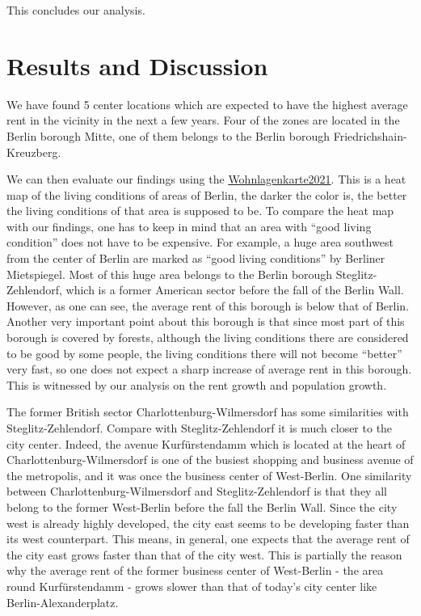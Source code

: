 \documentclass[11pt]{article}
\begin{document}
        
    This concludes our analysis.

    \hypertarget{results-and-discussion}{%
\section{\texorpdfstring{Results and Discussion
}{Results and Discussion }}\label{results}}

    We have found 5 center locations which are expected to have the highest
average rent in the vicinity in the next a few years. Four of the zones
are located in the Berlin borough Mitte, one of them belongs to the
Berlin borough Friedrichshain-Kreuzberg.

We can then evaluate our findings using the
\href{https://www.stadtentwicklung.berlin.de/wohnen/mietspiegel/de/download/Wohnlagenkarte2021_highdpi.pdf}{Wohnlagenkarte2021}.
This is a heat map of the living conditions of areas of Berlin, the
darker the color is, the better the living conditions of that area is
supposed to be. To compare the heat map with our findings, one has to
keep in mind that an area with ``good living condition'' does not have
to be expensive. For example, a huge area southwest from the center of
Berlin are marked as ``good living conditions'' by Berliner Mietspiegel.
Most of this huge area belongs to the Berlin borough
Steglitz-Zehlendorf, which is a former American sector before the fall
of the Berlin Wall. However, as one can see, the average rent of this
borough is below that of Berlin. Another very important point about this
borough is that since most part of this borough is covered by forests,
although the living conditions there are considered to be good by some
people, the living conditions there will not become ``better'' very
fast, so one does not expect a sharp increase of average rent in this
borough. This is witnessed by our analysis on the rent growth and
population growth.

The former British sector Charlottenburg-Wilmersdorf has some
similarities with Steglitz-Zehlendorf. Compare with Steglitz-Zehlendorf
it is much closer to the city center. Indeed, the avenue Kurfürstendamm
which is located at the heart of Charlottenburg-Wilmersdorf is one of
the busiest shopping and business avenue of the metropolis, and it was
once the business center of West-Berlin. One similarity between
Charlottenburg-Wilmersdorf and Steglitz-Zehlendorf is that they all
belong to the former West-Berlin before the fall the Berlin Wall. Since
the city west is already highly developed, the city east seems to be
developing faster than its west counterpart. This means, in general, one
expects that the average rent of the city east grows faster than that of
the city west. This is partially the reason why the average rent of the
former business center of West-Berlin - the area round Kurfürstendamm -
grows slower than that of today's city center like
Berlin-Alexanderplatz.
\end{document}
